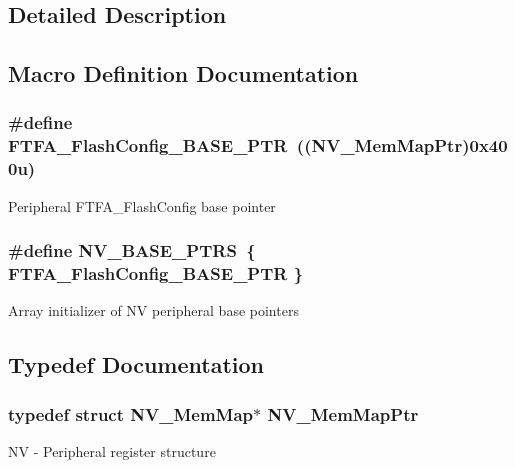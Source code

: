 \subsection{Detailed Description}


\subsection{Macro Definition Documentation}
\hypertarget{group___n_v___peripheral_ga3458652dfc38239f92682556e63596b5}{}
\subsubsection[{F\+T\+F\+A\+\_\+\+Flash\+Config\+\_\+\+B\+A\+S\+E\+\_\+\+P\+T\+R}]{\setlength{\rightskip}{0pt plus 5cm}\#define F\+T\+F\+A\+\_\+\+Flash\+Config\+\_\+\+B\+A\+S\+E\+\_\+\+P\+T\+R~(({\bf N\+V\+\_\+\+Mem\+Map\+Ptr})0x400u)}\label{group___n_v___peripheral_ga3458652dfc38239f92682556e63596b5}
Peripheral F\+T\+F\+A\+\_\+\+Flash\+Config base pointer \hypertarget{group___n_v___peripheral_ga1e44e66a8945b675dcebb6fbd6bdc85b}{}
\subsubsection[{N\+V\+\_\+\+B\+A\+S\+E\+\_\+\+P\+T\+R\+S}]{\setlength{\rightskip}{0pt plus 5cm}\#define N\+V\+\_\+\+B\+A\+S\+E\+\_\+\+P\+T\+R\+S~\{ {\bf F\+T\+F\+A\+\_\+\+Flash\+Config\+\_\+\+B\+A\+S\+E\+\_\+\+P\+T\+R} \}}\label{group___n_v___peripheral_ga1e44e66a8945b675dcebb6fbd6bdc85b}
Array initializer of N\+V peripheral base pointers 

\subsection{Typedef Documentation}
\hypertarget{group___n_v___peripheral_ga9aac431b01e6b976f2f4e32409ab725f}{}
\subsubsection[{N\+V\+\_\+\+Mem\+Map\+Ptr}]{\setlength{\rightskip}{0pt plus 5cm}typedef struct {\bf N\+V\+\_\+\+Mem\+Map}$\ast$ {\bf N\+V\+\_\+\+Mem\+Map\+Ptr}}\label{group___n_v___peripheral_ga9aac431b01e6b976f2f4e32409ab725f}
N\+V -\/ Peripheral register structure 